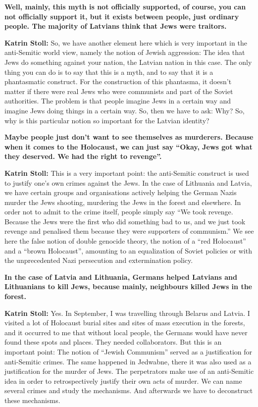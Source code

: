\textbf{Well, mainly, this myth is not officially supported, of course, you can not officially support it, but it exists between people, just ordinary people. The majority of Latvians think that Jews were traitors.} 

\textbf{Katrin Stoll:} So, we have another element here which is very important in the anti-Semitic world view, namely the notion of Jewish aggression: The idea that Jews do something against your nation, the Latvian nation in this case. The only thing you can do is to say that this is a myth, and to say that it is a phantasmatic construct. For the construction of this phantasma, it doesn’t matter if there were real Jews who were communists and part of the Soviet authorities. The problem is that people imagine Jews in a certain way and imagine Jews doing things in a certain way. So, then we have to ask: Why? So, why is this particular notion so important for the Latvian identity? 

\textbf{ Maybe people just don’t want to see themselves as murderers. Because when it comes to the Holocaust, we can just say "`Okay, Jews got what they deserved. We had the right to revenge"'.} 

\textbf{Katrin Stoll:} This is a very important point: the anti-Semitic construct is used to justify one’s own crimes against the Jews. In the case of Lithuania and Latvia, we have certain groups and organisations actively helping the German Nazis murder the Jews shooting, murdering the Jews in the forest and elsewhere. In order not to admit to the crime itself, people simply say "`We took revenge. Because the Jews were the first who did something bad to us, and we just took revenge and penalised them because they were supporters of communism."' We see here the false notion of double genocide theory, the notion of a "`red Holocaust"' and a "`brown Holocaust"', amounting to an equalization of Soviet policies or with the unprecedented Nazi persecution and extermination policy.  

\textbf{In the case of Latvia and Lithuania, Germans helped Latvians and Lithuanians to kill Jews, because mainly, neighbours killed Jews in the forest.}

\textbf{Katrin Stoll:} Yes. In September, I was travelling through Belarus and Latvia. I visited a lot of Holocaust burial sites and sites of mass execution in the forests, and it occurred to me that without local people, the Germans would have never found these spots and places. They needed collaborators.  But this is an important point: The notion of "`Jewish Communism"' served as a justification for anti-Semitic crimes. The same happened in Jedwabne, there it was also used as a justification for the murder of Jews. The perpetrators make use of an anti-Semitic idea in order to retrospectively justify their own acts of murder. We can name several crimes and study the mechanisms. And afterwards we have to deconstruct these mechanisms. 

